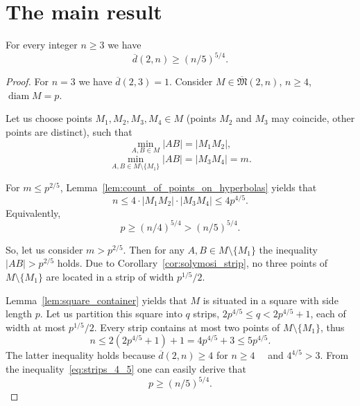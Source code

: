 \documentclass[11pt,twoside,draft
]{article}
\begin{document}
\section{The main result}

\begin{Theorem}
	\label{thm:main_result}
	For every integer $n \geq 3$ we have
	\begin{equation}
		\overline{d}(2,n) \geq (n/5)^{5/4}
		.
	\end{equation}
\end{Theorem}

\begin{proof}[Proof]
	For $n = 3$ we have $\overline{d}(2,3) = 1$.
	Consider $M\in\overline{\mathfrak{M}}(2,n)$, $n \geq 4$, $\operatorname{diam} M = p$.

	Let us choose points $M_1, M_2, M_3, M_4 \in M$
	(points $M_2$ and $M_3$ may coincide, other points are distinct), such that
	\begin{equation}
		\min_{A, B \in M} |AB| = |M_1 M_2|
		,
	\end{equation}
	\begin{equation}
		\min_{A, B \in M \setminus \{M_1\}} |AB| = |M_3 M_4| = m
		.
	\end{equation}

	For $m \leq p^{2/5}$, Lemma~\ref{lem:count_of_points_on_hyperbolas} yields that
	\begin{equation}
		n \leq 4 \cdot |M_1 M_2| \cdot |M_3 M_4| \leq  4 p^{4/5}
		.
	\end{equation}
	Equivalently,
	\begin{equation}
		\label{eq:hyperbolas_5_4}
		p \geq (n/4) ^ {5/4} > (n/5) ^ {5/4}
		.
	\end{equation}

	So, let us consider $m > p^{2/5}$.
	Then for any $A,B \in M\setminus\{M_1\}$ the inequality $|AB| > p^{2/5}$ holds.
	Due to Corollary~\ref{cor:solymosi_strip}, no three points of $M\setminus\{M_1\}$
	are located in a strip of width $p^{1/5} / 2$.



	Lemma~\ref{lem:square_container} yields that $M$ is situated in a square with side length $p$.
	Let us partition this square into $q$ strips, $2p^{4/5} \leq q < 2p^{4/5} + 1$, each of width at most $p^{1/5} / 2$.
	Every strip contains at most two points of  $M\setminus\{M_1\}$,
	thus
	\begin{equation}
		\label{eq:strips_4_5}
		n \leq 2(2p^{4/5} + 1) + 1
		= 4p^{4/5}+3
		\leq 5 p^{4/5}
		.
	\end{equation}
	The latter inequality holds because $\overline{d}(2,n) \geq 4$ for $n\geq 4$~~\cite{kurz2008minimum}
	and $4^{4/5}>3$.
	From the inequality~\eqref{eq:strips_4_5} one can easily derive that
	\begin{equation}
		\label{eq:strips_5_4}
		p \geq (n/5) ^ {5/4}
		.
	\end{equation}
\end{proof}
\end{document}
